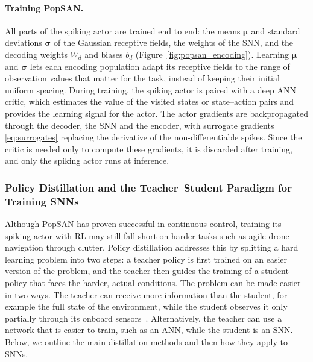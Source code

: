     \paragraph{Training PopSAN.} All parts of the spiking actor are trained end to end: the means $\boldsymbol{\mu}$ and standard deviations $\boldsymbol{\sigma}$ of the Gaussian receptive fields, the weights of the SNN, and the decoding weights $W_d$ and biases $b_d$ (Figure~\ref{fig:popsan_encoding}). Learning $\boldsymbol{\mu}$ and $\boldsymbol{\sigma}$ lets each encoding population adapt its receptive fields to the range of observation values that matter for the task, instead of keeping their initial uniform spacing. During training, the spiking actor is paired with a deep ANN critic, which estimates the value of the visited states or state--action pairs and provides the learning signal for the actor. The actor gradients are backpropagated through the decoder, the SNN and the encoder, with surrogate gradients \eqref{eq:surrogates} replacing the derivative of the non-differentiable spikes. Since the critic is needed only to compute these gradients, it is discarded after training, and only the spiking actor runs at inference.


\subsubsection{Policy Distillation and the Teacher--Student Paradigm for Training SNNs}
Although PopSAN has proven successful in continuous control, training its spiking actor with RL may still fall short on harder tasks such as agile drone navigation through clutter. Policy distillation addresses this by splitting a hard learning problem into two steps: a teacher policy is first trained on an easier version of the problem, and the teacher then guides the training of a student policy that faces the harder, actual conditions. The problem can be made easier in two ways. The teacher can receive more information than the student, for example the full state of the environment, while the student observes it only partially through its onboard sensors~\cite{songLearningPerceptionAwareAgile2023}. Alternatively, the teacher can use a network that is easier to train, such as an ANN, while the student is an SNN. Below, we outline the main distillation methods and then how they apply to SNNs.

